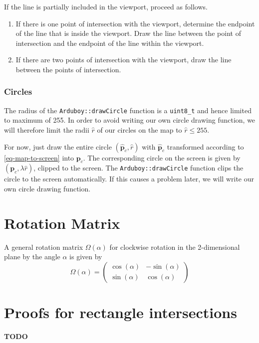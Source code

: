 \documentclass[11pt]{article}
\newcommand{\pbc}{\mathbf{p}_c}
\newcommand{\pbchat}{\hat{\mathbf{p}}_c}
\newcommand{\rhat}{\hat{r}}
\begin{document}
If the line is partially included in the viewport, proceed as follows.
\begin{enumerate}
    \item If there is one point of intersection with the viewport, determine
        the endpoint of the line that is inside the viewport. Draw the line
        between the point of intersection and the endpoint of the line within
        the viewport.
    \item If there are two points of intersection with the viewport, draw the
        line between the points of intersection.
\end{enumerate}

\subsubsection{Circles}
\label{sec-map-drawing-circles}
The radius of the \texttt{Arduboy::drawCircle} function is a \texttt{uint8\_t}
and hence limited to maximum of 255. In order to avoid writing our own circle
drawing function, we will therefore limit the radii $\rhat$ of our circles on
the map to $\rhat\leq 255$.

For now, just draw the entire circle $(\pbchat, \rhat)$ with $\pbchat$
transformed according to \eqref{eq-map-to-screen} into $\pbc$.
The corresponding circle on the screen is given by $(\pbc, \lambda\rhat)$,
clipped to the screen.
The \texttt{Arduboy::drawCircle} function clips the circle to the screen
automatically.
If this causes a problem later, we will write our own circle drawing function.

\appendix
\section{Rotation Matrix}
\label{appendix-rotation-matrix}
A general rotation matrix $\Omega(\alpha)$ for clockwise rotation in the
2-dimensional plane by the angle $\alpha$ is given by
\begin{equation}
    \Omega(\alpha) = \begin{pmatrix}
        \cos(\alpha) & -\sin(\alpha) \\
        \sin(\alpha) & \cos(\alpha)
    \end{pmatrix}
\end{equation}

\section{Proofs for rectangle intersections}
\label{appendix-proofs-rectangle-intersections}

\textbf{\color{red}TODO}
\end{document}
